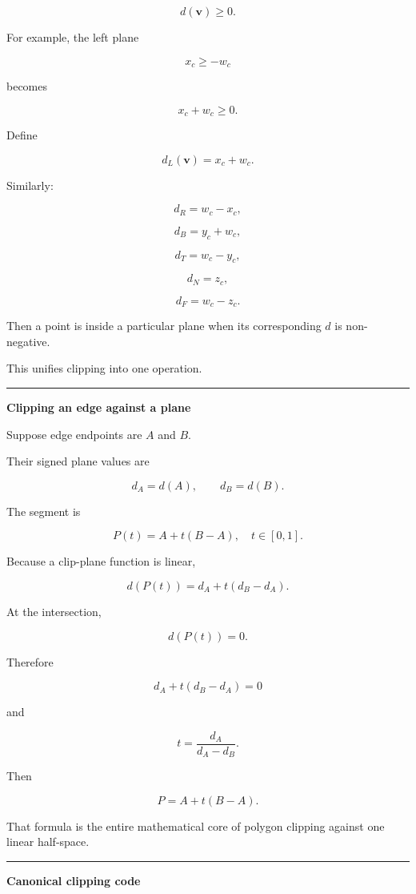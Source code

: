 \[
d(\mathbf v)\ge0.
\]

For example, the left plane

\[
x_c\ge-w_c
\]

becomes

\[
x_c+w_c\ge0.
\]

Define

\[
d_L(\mathbf v)=x_c+w_c.
\]

Similarly:

\[
d_R=w_c-x_c,
\]

\[
d_B=y_c+w_c,
\]

\[
d_T=w_c-y_c,
\]

\[
d_N=z_c,
\]

\[
d_F=w_c-z_c.
\]

Then a point is inside a particular plane when its corresponding \(d\) is non-negative.

This unifies clipping into one operation.

\begin{center}\rule{0.5\linewidth}{0.5pt}\end{center}

\textbf{Clipping an edge against a plane}

Suppose edge endpoints are \(A\) and \(B\).

Their signed plane values are

\[
d_A=d(A),\qquad
d_B=d(B).
\]

The segment is

\[
P(t)=A+t(B-A),\quad t\in[0,1].
\]

Because a clip-plane function is linear,

\[
d(P(t))
=
d_A+t(d_B-d_A).
\]

At the intersection,

\[
d(P(t))=0.
\]

Therefore

\[
d_A+t(d_B-d_A)=0
\]

and

\[
\boxed{
t=
\frac{d_A}{d_A-d_B}
}.
\]

Then

\[
\boxed{
P=A+t(B-A)
}.
\]

That formula is the entire mathematical core of polygon clipping against one linear half-space.

\begin{center}\rule{0.5\linewidth}{0.5pt}\end{center}

\textbf{Canonical clipping code}

